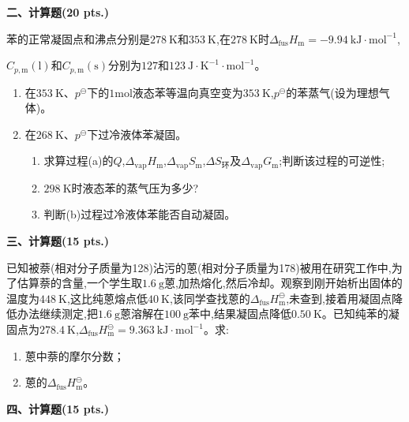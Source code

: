 \vspace{0.5cm}
\noindent\textbf{二、计算题(20 pts.)}

苯的正常凝固点和沸点分别是$278\ \mathrm{K}$和$353\ \mathrm{K}$,在$278\ \mathrm{K}$时$\Delta_{\mathrm{fus}}H_\mathrm{m}=-9.94\ \mathrm{kJ\cdot mol^{-1}}$,

$C_{p,\mathrm{m}}(\mathrm{l})$和$C_{p,\mathrm{m}}(\mathrm{s})$分别为$127$和$123\ \mathrm{J\cdot K^{-1}\cdot mol^{-1}}$。
\begin{enumerate}[label=(\alph*), itemsep=1ex]
    \item 在$353\ \mathrm{K}$、$p^\ominus$下的$1\mathrm{mol}$液态苯等温向真空变为$353\ \mathrm{K}$,$p^\ominus$的苯蒸气(设为理想气体)。
    \item 在$268\ \mathrm{K}$、$p^\ominus$下过冷液体苯凝固。
    \begin{enumerate}[label=(\arabic*), itemsep=1ex]
        \item 求算过程(a)的$Q$,$\Delta_{\mathrm{vap}}H_\mathrm{m}$,$\Delta_{\mathrm{vap}}S_\mathrm{m}$,$\Delta S_\mathrm{环}$及$\Delta_{\mathrm{vap}}G_\mathrm{m}$;判断该过程的可逆性;
        \item $298\ \mathrm{K}$时液态苯的蒸气压为多少?
        \item 判断(b)过程过冷液体苯能否自动凝固。
    \end{enumerate}
\end{enumerate}

\vspace{0.5cm}
\noindent\textbf{三、计算题(15 pts.)}

已知被萘(相对分子质量为128)沾污的蒽(相对分子质量为178)被用在研究工作中,为了估算萘的含量,一个学生取$1.6\ \mathrm{g}$蒽,加热熔化,然后冷却。观察到刚开始析出固体的温度为$448\ \mathrm{K}$,这比纯蒽熔点低$40\ \mathrm{K}$,该同学查找蒽的$\Delta_{\mathrm{fus}}H_\mathrm{m}^\ominus$,未查到,接着用凝固点降低办法继续测定,把$1.6\ \mathrm{g}$蒽溶解在$100\ \mathrm{g}$苯中,结果凝固点降低$0.50\ \mathrm{K}$。已知纯苯的凝固点为$278.4\ \mathrm{K}$,$\Delta_{\mathrm{fus}}H_\mathrm{m}^\ominus=9.363\ \mathrm{kJ\cdot mol^{-1}}$。求:
\begin{enumerate}[label=(\arabic*), itemsep=1ex]
    \item 蒽中萘的摩尔分数；
    \item 蒽的$\Delta_{\mathrm{fus}}H_\mathrm{m}^\ominus$。
\end{enumerate}

\vspace{0.5cm}
\noindent\textbf{四、计算题(15 pts.)}

